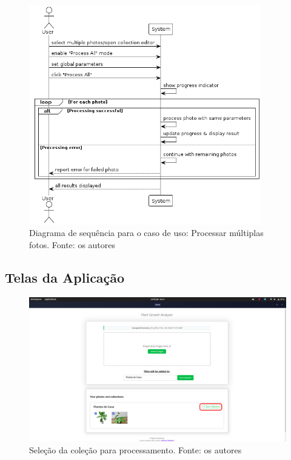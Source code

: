 \begin{figure}[H]
    \centering
    \includegraphics[width=0.9\textwidth]{../figures/dss/UC012.png}
    \caption{Diagrama de sequência para o caso de uso: Processar múltiplas fotos. Fonte: os autores}
    \label{fig:dss-uc012}
\end{figure}

\subsection{Telas da Aplicação}

\begin{figure}[H]
    \centering
    \includegraphics[width=1\textwidth]{../figures/screens/uc012/Screenshot from 2025-06-28 16-44-12.png}
    \caption{Seleção da coleção para processamento. Fonte: os autores}
    \label{fig:uc012-screen1}
\end{figure}

